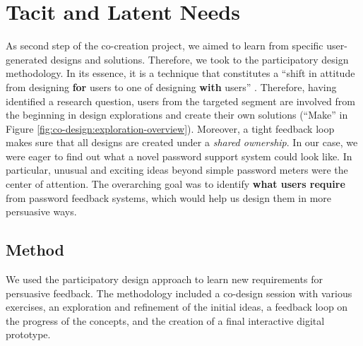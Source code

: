 \section{Tacit and Latent Needs}\label{sec:codesign:part2}
As second step of the co-creation project, we aimed to learn from specific user-generated designs and solutions. Therefore, we took to the participatory design methodology. In its essence, it is a technique that constitutes a ``shift in attitude from designing \textbf{for} users to one of designing \textbf{with} users'' \cite{Sanders2002ParticipatoryDesign}. Therefore, having identified a research question, users from the targeted segment are involved from the beginning in design explorations and create their own solutions (``Make'' in Figure \ref{fig:co-design:exploration-overview}). Moreover, a tight feedback loop makes sure that all designs are created under a \textit{shared ownership}. In our case, we were eager to find out what a novel password support system could look like. In particular, unusual and exciting ideas beyond simple password meters were the center of attention. The overarching goal was to identify \textbf{what users require} from password feedback systems, which would help us design them in more persuasive ways.






\subsection{Method}
We used the participatory design approach to learn new requirements for persuasive feedback. The methodology included a co-design session with various exercises, an exploration and refinement of the initial ideas, a feedback loop on the progress of the concepts, and the creation of a final interactive digital prototype.

